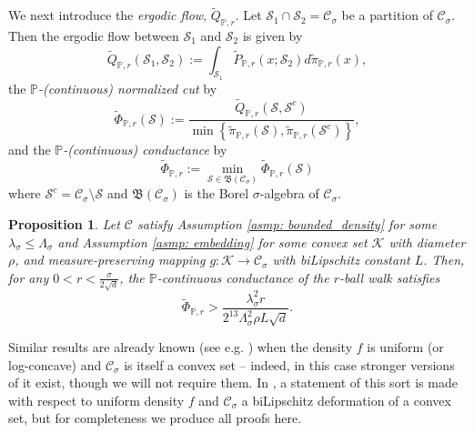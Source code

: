 \documentclass[11pt,twoside]{article}
\newtheorem{proposition}{Proposition}
\newcommand{\set}[1]{\left\{#1\right\}}
\newcommand{\1}{\mathbf{1}}
\newcommand{\Pbb}{\mathbb{P}}
\newcommand{\Sset}{\mathcal{S}}
\newcommand{\Cset}{\mathcal{C}}
\newcommand{\Csig}{\Cset_{\sigma}}
\newcommand{\piwt}{\widetilde{\pi}}
\begin{document}
We next introduce the \emph{ergodic flow}, $\widetilde{Q}_{\Pbb,r}$. Let $\Sset_1 \cap \Sset_2 = \Csig$ be a partition of $\Csig$. Then the ergodic flow between $\Sset_1$ and $\Sset_2$ is given by 
\begin{equation*}
\widetilde{Q}_{\Pbb,r}(\Sset_1, \Sset_2) := \int_{\Sset_1} \widetilde{P}_{\Pbb,r}(x; \Sset_2) d\piwt_{\Pbb,r}(x), 
\end{equation*}
the \emph{$\Pbb$-(continuous) normalized cut} by
\begin{equation*}
\widetilde{\Phi}_{\Pbb,r}(\Sset) := \frac{\widetilde{Q}_{\Pbb,r}(\Sset, \Sset^c)}{\min \set{\piwt_{\Pbb,r}(\Sset),\piwt_{\Pbb,r}(\Sset^c)}},
\end{equation*}
and the \emph{$\Pbb$-(continuous) conductance} by
\begin{equation*}
\widetilde{\Phi}_{\Pbb,r} := \min_{\Sset \in \mathfrak{B}(\Csig)} \widetilde{\Phi}_{\Pbb,r}(\Sset)
\end{equation*}
where $\Sset^c = \Csig \setminus \Sset$ and $\mathfrak{B}(\Csig)$ is the Borel $\sigma$-algebra of $\Csig$. 

\begin{proposition}
	\label{prop: nonuniform_continuous_conductance}
	Let $\Cset$ satisfy Assumption \ref{asmp: bounded_density} for some $\lambda_{\sigma} \leq \Lambda_{\sigma}$ and Assumption \ref{asmp: embedding} for some convex set $\mathcal{K}$ with diameter $\rho$, and measure-preserving mapping $g: \mathcal{K} \to \Csig$ with biLipschitz constant $L$. Then, for any $0 < r < \frac{\sigma}{2\sqrt{d}}$, the $\Pbb$-continuous conductance of the $r$-ball walk satisfies
	\begin{equation*}
	\widetilde{\Phi}_{\Pbb,r} > \frac{\lambda_{\sigma}^2 r}{2^{13} \Lambda_{\sigma}^2 \rho L \sqrt{d}}.
	\end{equation*}
\end{proposition}

Similar results are already known (see e.g. \cite{kannan04}) when the density $f$ is uniform (or log-concave) and $\Csig$ is itself a convex set -- indeed, in this case stronger versions of it exist, though we will not require them. In \cite{abbasi-yadkori2016a}, a statement of this sort is made with respect to uniform density $f$ and $\Csig$ a biLipschitz deformation of a convex set, but for completeness we produce all proofs here.
\end{document}
